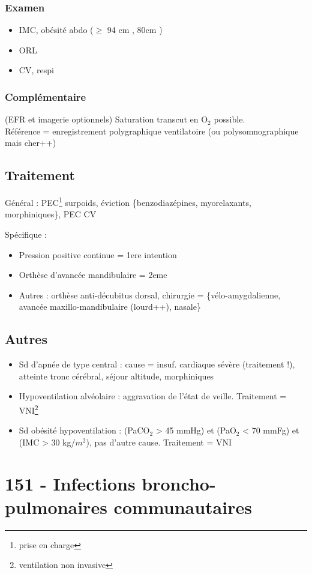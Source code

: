 \subsubsection{Examen}
\begin{itemize}
\item IMC, obésité abdo (\(\ge\) 94 cm \male, 80cm \female)
\item ORL
\item CV, respi
\end{itemize}
\subsubsection{Complémentaire}
(EFR et imagerie optionnels)
Saturation transcut en O\(_{\text{2}}\) possible.\\
Référence = enregistrement polygraphique ventilatoire (ou polysomnographique
mais cher++)
\subsection{Traitement}
Général : PEC\footnote{prise en charge} surpoids, éviction \{benzodiazépines,
myorelaxants, morphiniques\}, PEC CV

Spécifique :
\begin{itemize}
\item Pression positive continue = 1ere intention
\item Orthèse d'avancée mandibulaire = 2eme
\item Autres : orthèse anti-décubitus dorsal, chirurgie = \{vélo-amygdalienne,
  avancée maxillo-mandibulaire (lourd++), nasale\}
\end{itemize}
\subsection{Autres}
\begin{itemize}
\item Sd d'apnée de type central : cause = {insuf. cardiaque sévère (traitement !),
    atteinte tronc cérébral, séjour altitude, morphiniques}
\item Hypoventilation alvéolaire : aggravation de l'état de veille. Traitement =
  VNI\footnote{ventilation non invasive}
\item Sd obésité hypoventilation : (PaCO\(_{\text{2}}\) > 45 mmHg) et (PaO\(_{\text{2}}\) < 70 mmFg) et
  (IMC > 30 kg/\(m^2\)), pas d'autre cause. Traitement = VNI
\end{itemize}

\section{151 - Infections broncho-pulmonaires communautaires}
